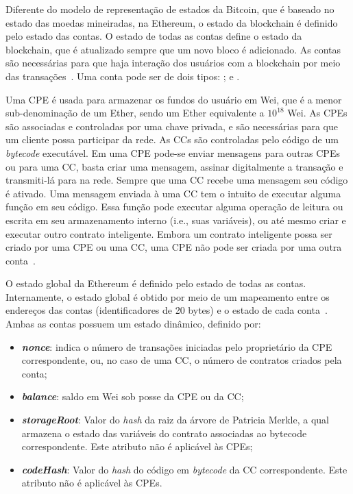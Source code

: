 Diferente do modelo de representação de estados da Bitcoin, que é baseado no estado das moedas mineiradas, na Ethereum, o estado da blockchain é definido pelo estado das contas. O estado de todas as contas define o estado da blockchain, que é atualizado sempre que um novo bloco é adicionado. As contas são necessárias para que haja interação dos usuários com a blockchain por meio das transações~\cite{ethereum-homestead2020documentation}. Uma conta pode ser de dois tipos: ; e . 

Uma CPE é usada para armazenar os fundos do usuário em Wei, que é a menor sub-denominação de um Ether, sendo um Ether equivalente a $10^{18}$ Wei. As CPEs são associadas e controladas por uma chave privada, e são necessárias para que um cliente possa participar da rede. As CCs são controladas pelo código de um \textit{bytecode} executável. Em uma CPE pode-se enviar mensagens para outras CPEs ou para uma CC, basta criar uma mensagem, assinar digitalmente a transação e transmiti-lá para na rede. Sempre que uma CC recebe uma mensagem seu código é ativado. Uma mensagem enviada à uma CC tem o intuito de executar alguma função em seu código. Essa função pode executar alguma operação de leitura ou escrita em seu armazenamento interno (i.e., suas variáveis), ou até mesmo criar e executar outro contrato inteligente. Embora um contrato inteligente possa ser criado por uma CPE ou uma CC, uma CPE não pode ser criada por uma outra conta~\cite{ethereum2014whitepaper, chen2020survey-ethereum-acm}. 

O estado global da Ethereum é definido pelo estado de todas as contas. Internamente, o estado global é obtido por meio de um mapeamento entre os endereços das contas (identificadores de 20 bytes) e o estado de cada conta~\cite{wood2014ethereum-yellow-paper}. Ambas as contas possuem um estado dinâmico, definido por: 
\begin{itemize}
    \item \textbf{\textit{nonce}}: indica o número de transações iniciadas pelo proprietário da CPE correspondente, ou, no caso de uma CC, o número de contratos criados pela conta;
    \item \textbf{\textit{balance}}: saldo em Wei sob posse da CPE ou da CC;
    \item \textbf{\textit{storageRoot}}: Valor do \textit{hash} da raiz da árvore de Patricia Merkle, a qual armazena o estado das variáveis do contrato associadas ao bytecode correspondente. Este atributo não é aplicável às CPEs;
    \item \textbf{\textit{codeHash}}: Valor do \textit{hash} do código em \textit{bytecode} da CC correspondente. Este atributo não é aplicável às CPEs.
\end{itemize}

